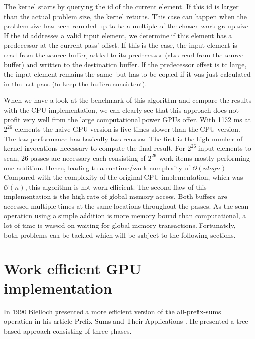 

\pagebreak

The kernel starts by querying the id of the current element. If this id is larger than the actual problem size, the kernel returns. This case can happen when the problem size has been rounded up to be a multiple of the chosen work group size. If the id addresses a valid input element, we determine if this element has a predecessor at the current pass' offset. If this is the case, the input element is read from the source buffer, added to its predecessor (also read from the source buffer) and written to the destination buffer. If the predecessor offset is to large, the input element remains the same, but has to be copied if it was just calculated in the last pass (to keep the buffers consistent).

When we have a look at the benchmark of this algorithm and compare the results with the CPU implementation, we can clearly see that this approach does not profit very well from the large computational power GPUs offer. With 1132 ms at $2^{26}$ elements the naive GPU version is five times slower than the CPU version. The low performance has basically two reasons. The first is the high number of kernel invocations necessary to compute the final result. For $2^{26}$ input elements to scan, 26 passes are necessary each consisting of $2^{26}$ work items mostly performing one addition. Hence, leading to a runtime/work complexity of $\mathcal{O}(n log n)$. Compared with the complexity of the original CPU implementation, which was $\mathcal{O}(n)$, this algorithm is not work-efficient. The second flaw of this implementation is the high rate of global memory access. Both buffers are accessed multiple times at the same locations throughout the passes. As the scan operation using a simple addition is more memory bound than computational, a lot of time is wasted on waiting for global memory transactions.
Fortunately, both problems can be tackled which will be subject to the following sections.


\section{Work efficient GPU implementation}
\label{sec:scan_work_efficient}

In 1990 Blelloch presented a more efficient version of the all-prefix-sums operation in his article Prefix Sums and Their Applications \cite{scan_blelloch}. He presented a tree-based approach consisting of three phases.

